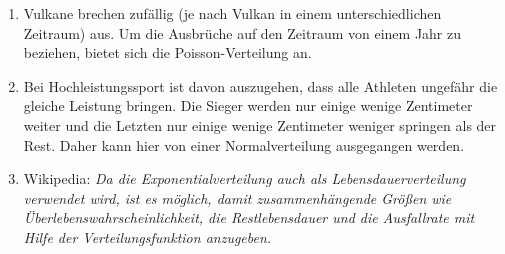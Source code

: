 \documentclass{homework}
\date{Montag, dem 14. Januar 2013}
\author{Stefan Meißner (4279113) und Niels Hoppe (4356370)}
\begin{document}
\maketitle
\begin{enumerate} 

\begin{enumerate}
\item 
Vulkane brechen zufällig (je nach Vulkan in einem unterschiedlichen Zeitraum) aus. 
Um die Ausbrüche auf den Zeitraum von einem Jahr zu beziehen, bietet sich die Poisson-Verteilung an.
\item 
Bei Hochleistungssport ist davon auszugehen, dass alle Athleten ungefähr die gleiche Leistung bringen.
Die Sieger werden nur einige wenige Zentimeter weiter und die Letzten nur einige wenige Zentimeter weniger springen als der Rest.
Daher kann hier von einer Normalverteilung ausgegangen werden.
\item %
Wikipedia: \textit{Da die Exponentialverteilung auch als Lebensdauerverteilung verwendet wird, ist es möglich,
damit zusammenhängende Größen wie Überlebenswahrscheinlichkeit,
die Restlebensdauer und die Ausfallrate mit Hilfe der Verteilungsfunktion anzugeben.}
\end{enumerate}



\end{enumerate}
\end{document}
